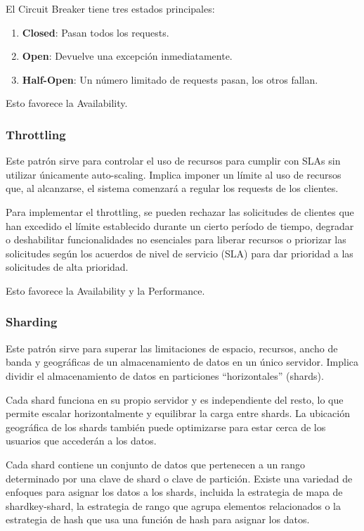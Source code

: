 \documentclass{article}
\begin{document}
		El Circuit Breaker tiene tres estados principales:
			\begin{enumerate}
				\item \textbf{Closed}: Pasan todos los requests.
				
				\item \textbf{Open}: Devuelve una excepción inmediatamente.
				\item \textbf{Half-Open}: Un número limitado de	requests pasan, los otros fallan.
			
			\end{enumerate}
		
		Esto favorece la Availability.
		
		\subsubsection{Throttling}
		Este patrón sirve para controlar el uso de recursos para cumplir con SLAs sin utilizar únicamente auto-scaling. Implica imponer un límite al uso de recursos que, al alcanzarse, el sistema comenzará a regular los requests de los clientes.
		
		Para implementar el throttling, se pueden rechazar las solicitudes de clientes que han excedido el límite establecido durante un cierto período de tiempo, degradar o deshabilitar funcionalidades no esenciales para liberar recursos o priorizar las solicitudes según los acuerdos de nivel de servicio (SLA) para dar prioridad a las solicitudes de alta prioridad.
		
		Esto favorece la Availability y la Performance.
		
				
		\subsubsection{Sharding}\label{sec:sharding_generico}
		Este patrón sirve para superar las limitaciones de espacio, recursos, ancho de banda y geográficas de un almacenamiento de datos en un único servidor. Implica dividir el almacenamiento de datos en particiones ``horizontales'' (shards).
		
		Cada shard funciona en su propio servidor y es independiente del resto, lo que permite escalar horizontalmente y equilibrar la carga entre shards. La ubicación geográfica de los shards también puede optimizarse para estar cerca de los usuarios que accederán a los datos.
		
		Cada shard contiene un conjunto de datos que pertenecen a un rango determinado por una clave de shard o clave de partición. Existe una variedad de enfoques para asignar los datos a los shards, incluida la estrategia de mapa de shardkey-shard, la estrategia de rango que agrupa elementos relacionados o la estrategia de hash que usa una función de hash para asignar los datos.
		
\end{document}
